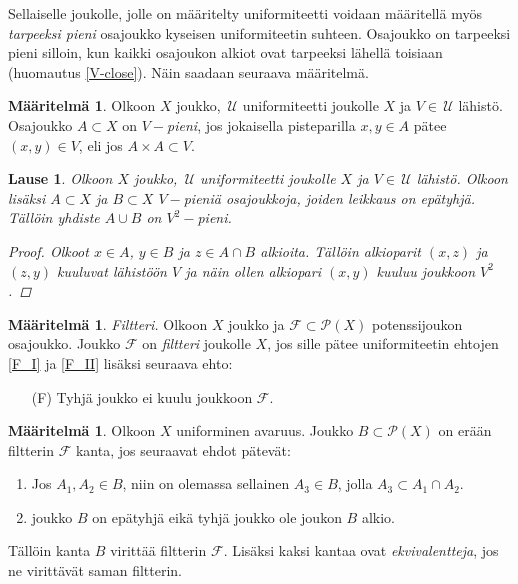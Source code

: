 \documentclass[12pt,a4paper,leqno]{report}
\newcommand{\U}{\,\mathcal{U}}
\newcommand{\Pot}{\mathcal{P}}
\newcommand{\F}{\mathcal{F}}
\theoremstyle{plain}
\newtheorem{lause}[equation]{Lause}
\theoremstyle{definition}
\newtheorem{maar}[equation]{Määritelmä}
\theoremstyle{remark}
\begin{document}
Sellaiselle joukolle, jolle on määritelty uniformiteetti voidaan määritellä myös 
\emph{tarpeeksi pieni} osa\-jouk\-ko kyseisen uniformiteetin suhteen. 
Osajoukko on tarpeeksi pieni silloin, kun kaikki osajoukon alkiot ovat 
tarpeeksi lähellä toisiaan (huomautus \ref{V-close}). 
Näin saadaan seuraava määritelmä.
\begin{maar}
Olkoon $X$ joukko, $\U$ uniformiteetti joukolle $X$ ja $V\in\U$ lähistö. 
Osajoukko $A\subset X$ on \emph{$V-$pieni}, jos 
jokaisella pisteparilla $x,y\in A$ pätee $(x,y)\in V$, eli jos $A\times A\subset V$.
\end{maar}
\begin{lause}
Olkoon $X$ joukko, $\U$ uniformiteetti joukolle $X$ ja $V\in\U$ lähistö. 
Olkoon lisäksi $A\subset X$ ja $B\subset X$ $V-$pieniä osajoukkoja, 
joiden leikkaus on epätyhjä. 
Tällöin yhdiste $A\cup B$ on $V^2-$pieni.
\begin{proof}
Olkoot $x\in A$, $y\in B$ ja $z\in A\cap B$ alkioita. 
Tällöin alkioparit $(x,z)$ ja $(z,y)$ kuuluvat lähistöön $V$ 
ja näin ollen alkiopari $(x,y)$ kuuluu joukkoon $V^2$.
\end{proof}
\end{lause}
\begin{maar}
\emph{Filtteri.} Olkoon $X$ joukko ja $\F\subset \Pot(X)$ potenssijoukon osajoukko. 
Joukko $\F$ on \emph{filtteri} joukolle $X$, jos sille pätee 
uniformiteetin ehtojen \ref{F_I} ja \ref{F_II} lisäksi 
seuraava ehto:
\begin{enumerate}
\item[(F)] Tyhjä joukko ei kuulu joukkoon $\F$.
\end{enumerate} 
\end{maar}
\begin{maar}
Olkoon $X$ uniforminen avaruus. Joukko $B\subset\Pot(X)$ on erään filtterin $\F$ kanta, jos seuraavat ehdot pätevät:
\begin{enumerate} 
\item Jos $A_1,A_2\in B$, niin on olemassa sellainen $A_3\in B$, 
jolla $A_3\subset A_1\cap A_2$.
\item joukko $B$ on epätyhjä eikä tyhjä joukko ole joukon $B$ alkio.
\end{enumerate}
Tällöin kanta $B$ virittää filtterin $\F$. 
Lisäksi kaksi kantaa ovat 
\emph{ekvivalentteja}, jos ne virittävät saman filtterin.
\end{maar}
\end{document}
